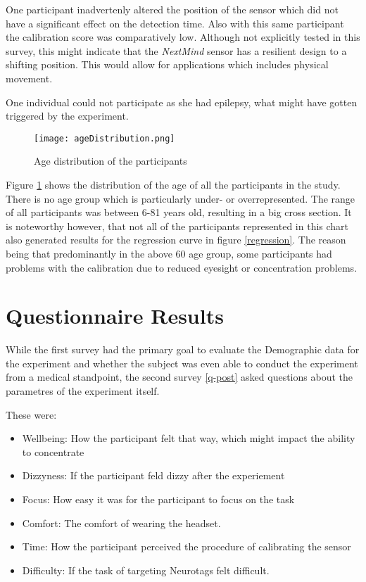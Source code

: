             One participant inadvertenly altered the position of the sensor which did not have a significant effect on the detection time. Also with this same participant the calibration score was comparatively low. Although not explicitly tested in this survey, this might indicate that the \textit{NextMind} sensor has a resilient design to a shifting position. This would allow for applications which includes physical movement.

            One individual could not participate as she had epilepsy, what might have gotten triggered by the experiment.

            \begin{figure}[h]     %
                \centering
                \texttt{[image: ageDistribution.png]} 
                \caption{Age distribution of the participants}\label{age-dist}
            \end{figure}

            Figure \ref*{age-dist} shows the distribution of the age of all the participants in the study. There is no age group which is particularly under- or overrepresented. The range of all participants was between 6-81 years old, resulting in a big cross section. It is noteworthy however, that not all of the participants represented in this chart also generated results for the regression curve in figure \ref*{regression}. The reason being that predominantly in the above 60 age group, some participants had problems with the calibration due to reduced eyesight or concentration problems.
     
        \section{Questionnaire Results}

            While the first survey had the primary goal to evaluate the Demographic data for the experiment and whether the subject was even able to conduct the experiment from a medical standpoint, the second survey \ref*{q-post} asked questions about the parametres of the experiment itself.

            These were:

            \begin{itemize}
                \item Wellbeing: How the participant felt that way, which might impact the ability to concentrate
                \item Dizzyness: If the participant feld dizzy after the experiement
                \item Focus: How easy it was for the participant to focus on the task
                \item Comfort: The comfort of wearing the headset.
                \item Time: How the participant perceived the procedure of calibrating the sensor 
                \item Difficulty: If the task of targeting Neurotags felt difficult.
            \end{itemize}

